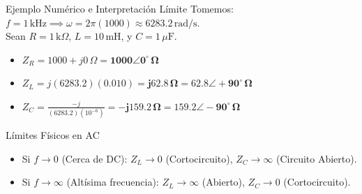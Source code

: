 \documentclass[aspectratio=169, 10pt]{beamer}
\begin{document}
\begin{frame}{Ejemplo Numérico e Interpretación Límite}
    Tomemos: $f = 1\,\text{kHz} \implies \omega = 2\pi(1000) \approx 6283.2\,\text{rad/s}$. \\
    Sean $R = 1\,\text{k}\Omega$, $L = 10\,\text{mH}$, y $C = 1\,\mu\text{F}$.
    \begin{itemize}
        \item $Z_R = 1000 + j0\,\Omega = \mathbf{1000\angle 0^\circ\,\Omega}$
        \item $Z_L = j(6283.2)(0.010) = \mathbf{j62.8\,\Omega} = \mathbf{62.8\angle +90^\circ\,\Omega}$
        \item $Z_C = \frac{-j}{(6283.2)(10^{-6})} = \mathbf{-j159.2\,\Omega} = \mathbf{159.2\angle -90^\circ\,\Omega}$
    \end{itemize}
    
    \vspace{0.2cm}
    \begin{alertblock}{Límites Físicos en AC}
        \begin{itemize}
            \item Si $f \to 0$ (Cerca de DC): $Z_L \to 0$ (Cortocircuito), $Z_C \to \infty$ (Circuito Abierto).
            \item Si $f \to \infty$ (Altísima frecuencia): $Z_L \to \infty$ (Abierto), $Z_C \to 0$ (Cortocircuito).
        \end{itemize}
    \end{alertblock}
\end{frame}

\end{document}
